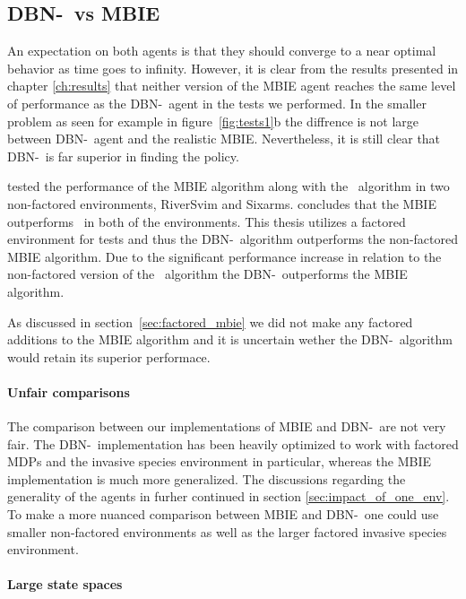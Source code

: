 \subsection{DBN-\etre\ vs MBIE}
\label{sec:dbn_vs_mbie}

An expectation on both agents is that they should converge to a near optimal
behavior as time goes to infinity. However, it is clear from the results
presented in chapter \ref{ch:results} that neither version of the MBIE agent
reaches the same level of performance as the DBN-\etre\ agent in the tests we
performed. In the smaller problem as seen for example in
figure~\ref{fig:tests1}b the diffrence is not large between DBN-\etre\ agent
and the realistic MBIE. Nevertheless, it is still clear that DBN-\etre\ is far
superior in finding the policy.

\textcite{strehl2004empirical} tested the performance of the MBIE algorithm
along with the \etre\ algorithm in two non-factored environments, RiverSvim and
Sixarms. \textcite{strehl2004empirical} concludes that the MBIE outperforms
\etre\ in both of the environments. This thesis utilizes a factored environment
for tests and thus the DBN-\etre\ algorithm outperforms the non-factored MBIE
algorithm. Due to the significant performance increase in relation to the
non-factored version of the \etre\ algorithm the DBN-\etre\ outperforms the
MBIE algorithm.

As discussed in section~\ref{sec:factored_mbie} we did not make any factored
additions to the MBIE algorithm and it is uncertain wether the DBN-\etre\
algorithm would retain its superior performace.

\paragraph{Unfair comparisons}

The comparison between our implementations of MBIE and DBN-\etre\ are not very
fair. The DBN-\etre\ implementation has been heavily optimized to work with
factored MDPs and the invasive species environment in particular, whereas the
MBIE implementation is much more generalized. The discussions regarding the
generality of the agents in furher continued in section
\ref{sec:impact_of_one_env}. To make a more nuanced comparison between MBIE and
DBN-\etre\ one could use smaller non-factored environments as well as the
larger factored invasive species environment.


\paragraph{Large state spaces}

